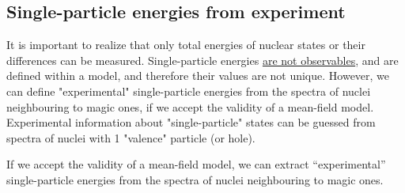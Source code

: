 \documentclass[11pt,a4paper]{article}
\begin{document}
\subsection{Single-particle energies from experiment}
It is important to realize that only total energies of nuclear states or their differences can be measured. Single-particle energies \underline {are not observables}, and are defined within a model, and therefore their values are not unique. However, we can define "experimental" single-particle energies from the spectra of nuclei neighbouring to magic ones, if we accept the validity of a mean-field model. Experimental information about "single-particle" states can be guessed from spectra of nuclei with 1 "valence" particle (or hole).


If we accept the validity of a mean-field model, we can extract ``experimental'' single-particle energies from the spectra of nuclei neighbouring to magic ones.
\end{document}
